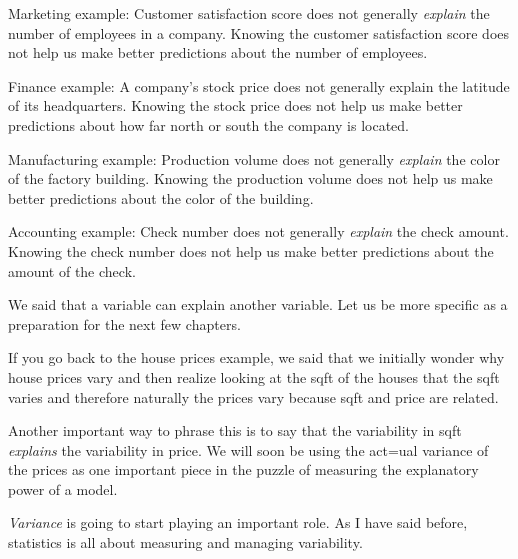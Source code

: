 \documentclass[
  12pt,
  letterpaper,
  DIV=11,
  numbers=noendperiod]{scrreprt}
\begin{document}
\begin{tcolorbox}[enhanced jigsaw, colback=white, leftrule=.75mm, toprule=.15mm, bottomtitle=1mm, breakable, coltitle=black, toptitle=1mm, title={Suggested answer}, opacitybacktitle=0.6, colbacktitle=quarto-callout-note-color!10!white, arc=.35mm, left=2mm, colframe=quarto-callout-note-color-frame, titlerule=0mm, rightrule=.15mm, bottomrule=.15mm, opacityback=0]

Marketing example: Customer satisfaction score does not generally
\emph{explain} the number of employees in a company. Knowing the
customer satisfaction score does not help us make better predictions
about the number of employees.

Finance example: A company's stock price does not generally explain the
latitude of its headquarters. Knowing the stock price does not help us
make better predictions about how far north or south the company is
located.

Manufacturing example: Production volume does not generally
\emph{explain} the color of the factory building. Knowing the production
volume does not help us make better predictions about the color of the
building.

Accounting example: Check number does not generally \emph{explain} the
check amount. Knowing the check number does not help us make better
predictions about the amount of the check.

\end{tcolorbox}

\begin{tcolorbox}[enhanced jigsaw, colback=white, leftrule=.75mm, toprule=.15mm, bottomtitle=1mm, breakable, coltitle=black, toptitle=1mm, title=\textcolor{quarto-callout-important-color}{\faExclamation}\hspace{0.5em}{Important}, opacitybacktitle=0.6, colbacktitle=quarto-callout-important-color!10!white, arc=.35mm, left=2mm, colframe=quarto-callout-important-color-frame, titlerule=0mm, rightrule=.15mm, bottomrule=.15mm, opacityback=0]

We said that a variable can explain another variable. Let us be more
specific as a preparation for the next few chapters.

If you go back to the house prices example, we said that we initially
wonder why house prices vary and then realize looking at the sqft of the
houses that the sqft varies and therefore naturally the prices vary
because sqft and price are related.

Another important way to phrase this is to say that the variability in
sqft \emph{explains} the variability in price. We will soon be using the
act=ual variance of the prices as one important piece in the puzzle of
measuring the explanatory power of a model.

\emph{Variance} is going to start playing an important role. As I have
said before, statistics is all about measuring and managing variability.

\end{tcolorbox}
\end{document}
